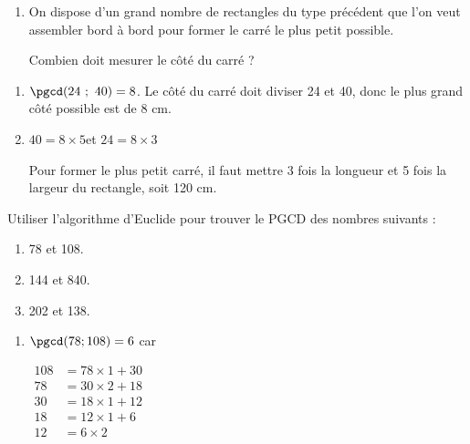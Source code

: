 \documentclass{cornouaille}
\begin{document}
\begin{colonne*exercice}
\begin{exercice*}
\begin{enumerate}
Combien doit mesurer le côté du carré ?

\item On dispose d’un grand nombre de rectangles du type précédent que
  l’on veut assembler bord à bord pour former le carré le plus petit possible.

Combien doit mesurer le côté du carré ?
\end{enumerate}
\end{exercice*}
\begin{corrige}
  \begin{enumerate}
  \item$\pgcd(24\ ;\ 40)=8$. Le côté du carré doit diviser 24 et 40, donc
    le plus grand côté possible est de 8 cm.

  \item $40=8\times5$\enskip et \enskip $24=8\times3$

  Pour former le plus petit carré, il faut mettre 3 fois la longueur
  et 5 fois la largeur du rectangle, soit 120 cm.
\end{enumerate}
\end{corrige}

\begin{exercice*}
  Utiliser l’algorithme d’Euclide pour trouver le PGCD des nombres
  suivants :

\vspace{-2mm}
\begin{multicols}{2}
\begin{enumerate}
\item 78 et 108.
\item 144 et 840.
\item 202 et 138.
\end{enumerate}
\end{multicols}
\end{exercice*}
\begin{corrige}
  \begin{enumerate}
  \item $\pgcd(78;108)=6$ car

    $\begin{aligned}
      108&=78\times1+30\\
      78&=30\times2+18\\
      30&=18\times1+12\\
      18&=12\times1+6\\
      12&=6\times2\end{aligned}$\medskip
    

\end{enumerate}
\end{corrige}
\end{colonne*exercice}
\end{document}
